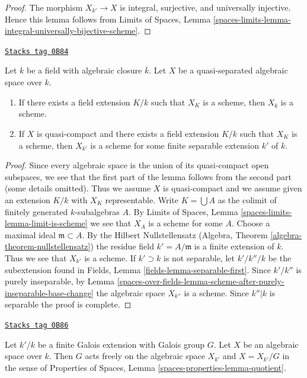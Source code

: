 \begin{proof}
The morphism $X_{k'} \to X$ is integral, surjective, and
universally injective. Hence this lemma follows from
Limits of Spaces, Lemma
\ref{spaces-limits-lemma-integral-universally-bijective-scheme}.
\end{proof}

\begin{lemma}
\label{spaces-over-fields-lemma-when-scheme-after-base-change}
\href{https://stacks.math.columbia.edu/tag/0B84}{\texttt{Stacks tag 0B84}}

Let $k$ be a field with algebraic closure $\overline{k}$.
Let $X$ be a quasi-separated algebraic space over $k$.
\begin{enumerate}
\item If there exists a field extension $K/k$ such that
$X_K$ is a scheme, then $X_{\overline{k}}$ is a scheme.
\item If $X$ is quasi-compact and there exists a field extension
$K/k$ such that $X_K$ is a scheme, then $X_{k'}$
is a scheme for some finite separable extension $k'$ of $k$.
\end{enumerate}
\end{lemma}

\begin{proof}
Since every algebraic space is the union of its quasi-compact open
subspaces, we see that the first part of the lemma follows from
the second part (some details omitted). Thus we assume $X$ is quasi-compact
and we assume given an extension $K/k$ with $X_K$ representable.
Write $K = \bigcup A$ as the colimit of finitely generated $k$-subalgebras
$A$. By Limits of Spaces, Lemma \ref{spaces-limits-lemma-limit-is-scheme}
we see that $X_A$ is a scheme for some $A$. Choose a maximal ideal
$\mathfrak m \subset A$. By the Hilbert Nullstellensatz
(Algebra, Theorem \ref{algebra-theorem-nullstellensatz})
the residue field $k' = A/\mathfrak m$ is a finite extension of $k$.
Thus we see that $X_{k'}$ is a scheme. If $k' \supset k$ is not
separable, let $k'/k''/k$ be the subextension
found in Fields, Lemma \ref{fields-lemma-separable-first}.
Since $k'/k''$ is purely inseparable, by
Lemma \ref{spaces-over-fields-lemma-scheme-after-purely-inseparable-base-change}
the algebraic space $X_{k''}$ is a scheme. Since $k''|k$ is separable
the proof is complete.
\end{proof}

\begin{lemma}
\label{spaces-over-fields-lemma-base-change-by-Galois}
\href{https://stacks.math.columbia.edu/tag/0B86}{\texttt{Stacks tag 0B86}}

Let $k'/k$ be a finite Galois extension with Galois group $G$.
Let $X$ be an algebraic space over $k$. Then $G$ acts freely on the
algebraic space $X_{k'}$ and $X = X_{k'}/G$ in the sense of
Properties of Spaces, Lemma \ref{spaces-properties-lemma-quotient}.
\end{lemma}

